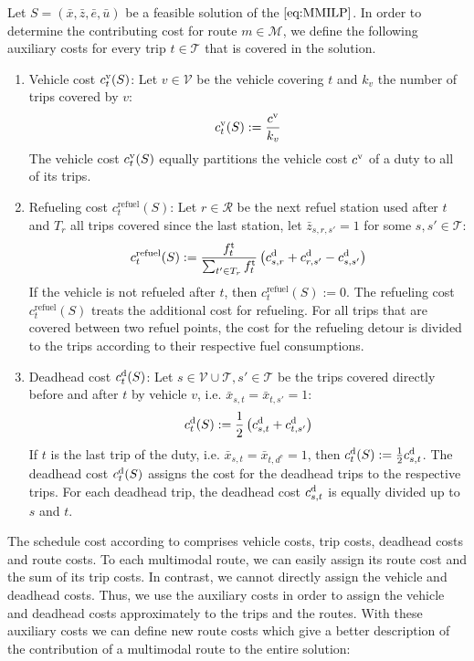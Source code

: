 Let $S=\left(\bar{x},\bar{z},\bar{e},\bar{u}\right)$ be a feasible solution of the $\eqref{eq:MMILP}$. In order to determine the contributing cost for route $m\in\mathcal{M}$, we define the following auxiliary costs for every trip $t\in\mathcal{T}$ that is covered in the solution. 
\begin{enumerate}
	\item{Vehicle cost $c^{\operatorname{v}}_t(S)$:}
Let $v\in\mathcal{V}$ be the vehicle covering $t$ and $k_v$ the number of trips covered by $v$: 
\begin{align*}
	c^{\operatorname{v}}_t(S) := \frac{c^{\operatorname{v}}}{k_v}
\end{align*}
The vehicle cost $c^{\operatorname{v}}_t(S)$ equally partitions the vehicle cost $c^{\operatorname{v}}$ of a duty to all of its trips.
	\item{Refueling cost $c^{\operatorname{refuel}}_t(S)$:}
Let $r\in\mathcal{R}$ be the next refuel station used after $t$ and $T_r$ all trips covered since the last station, let $\bar{z}_{s,r,s'} = 1$ for some ${s,s'\in\mathcal{T}}$: 
\begin{align*}
	c^{\operatorname{refuel}}_t(S) := \frac{f^{\operatorname{t}}_t}{\sum_{t'\in T_r} f^{\operatorname{t}}_t}\left(c^{\operatorname{d}}_{s,r}+c^{\operatorname{d}}_{r,s'}-c^{\operatorname{d}}_{s,s'}\right)
\end{align*}
If the vehicle is not refueled after $t$, then $c^{\operatorname{refuel}}_t(S) := 0$. The refueling cost $c^{\operatorname{refuel}}_t(S)$ treats the additional cost for refueling. For all trips that are covered between two refuel points, the cost for the refueling detour is divided to the trips according to their respective fuel consumptions.
	\item{Deadhead cost $c^{\operatorname{d}}_t(S)$:}
Let $s\in\mathcal{V}\cup\mathcal{T},s'\in\mathcal{T}$ be the trips covered directly before and after $t$ by vehicle $v$, i.e. $\bar{x}_{s,t}=\bar{x}_{t,s'}=1$: 
\begin{align*}
	c^{\operatorname{d}}_t(S) := \frac 1 2 \left(c^{\operatorname{d}}_{s,t}+c^{\operatorname{d}}_{t,s'}\right)
\end{align*}
If $t$ is the last trip of the duty, i.e. $\bar{x}_{s,t}=\bar{x}_{t,d^{\operatorname{e}}}=1$, then $c^{\operatorname{d}}_t(S) := \frac 1 2 c^{\operatorname{d}}_{s,t}$. The deadhead cost $c^{\operatorname{d}}_t(S)$ assigns the cost for the deadhead trips to the respective trips. For each deadhead trip, the deadhead cost $c^{\operatorname{d}}_{s,t}$ is equally divided up to $s$ and $t$.
\end{enumerate}

The schedule cost according to  comprises vehicle costs, trip costs, deadhead costs and route costs. To each multimodal route, we can easily assign its route cost and the sum of its trip costs. In contrast, we cannot directly assign the vehicle and deadhead costs. Thus, we use the auxiliary costs in order to assign the vehicle and deadhead costs approximately to the trips and the routes. With these auxiliary costs we can define new route costs which give a better description of the contribution of a multimodal route to the entire solution:

